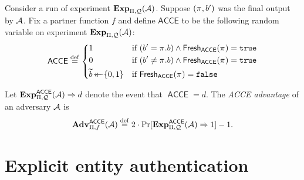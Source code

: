 \begin{definition}\label{def:security:acce}
Consider a run of experiment $\mathbf{Exp}_{\mathrm{\Pi},\mathcal{Q}}^{}(\mathcal{A})$.
Suppose $(\oracle, b')$ was the final output by $\mathcal{A}$. 
Fix a partner function $f$ and define $\mathsf{ACCE}$ to be the following random variable on experiment $\mathbf{Exp}_{\mathrm{\Pi},\mathcal{Q}}^{}(\mathcal{A})$:
\begin{equation}
\acce \defeq
	\begin{dcases}
		1 & \text{if } (b' = \oracle.b) \land \fresh_{\acce}(\oracle) = \TRUE \\
		0 & \text{if } (b' \neq \oracle.b) \land \fresh_{\acce}(\oracle) = \TRUE \\
		\widetilde{b} \getsr \bits & \text{if } \fresh_{\acce}(\oracle) = \FALSE 
	\end{dcases} 
\end{equation}

Let $\mathbf{Exp}_{\mathrm{\Pi},\mathcal{Q}}^{\mathsf{ACCE}}(\mathcal{A}) \Rightarrow d$ denote the event that $\operatorname{\mathsf{ACCE}} = d$.
The \emph{ACCE advantage} of an adversary $\mathcal{A}$ is 
\begin{equation}
	\mathbf{Adv}_{\mathrm{\Pi},f}^{\mathsf{ACCE}}(\mathcal{A}) \overset{\mathrm{def}}{=}  2\cdot \Pr[\mathbf{Exp}_{\mathrm{\Pi},\mathcal{Q}}^{\mathsf{ACCE}}(\mathcal{A}) \Rightarrow 1] - 1   .
\end{equation}
\end{definition}













\section{Explicit entity authentication}\label{sec:definitions:EA}

